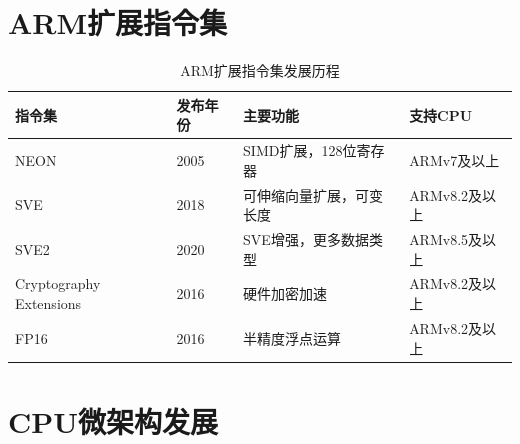 \documentclass[12pt,UTF8]{ctexbook}
\begin{document}
\section{ARM扩展指令集}

\begin{table}[H]
    \centering
    \begin{tabular}{|p{2cm}|p{3cm}|p{6cm}|p{3cm}|}
        \hline
        \textbf{指令集} & \textbf{发布年份} & \textbf{主要功能} & \textbf{支持CPU} \\
        \hline
        NEON & 2005 & SIMD扩展，128位寄存器 & ARMv7及以上 \\
        \hline
        SVE & 2018 & 可伸缩向量扩展，可变长度 & ARMv8.2及以上 \\
        \hline
        SVE2 & 2020 & SVE增强，更多数据类型 & ARMv8.5及以上 \\
        \hline
        Cryptography Extensions & 2016 & 硬件加密加速 & ARMv8.2及以上 \\
        \hline
        FP16 & 2016 & 半精度浮点运算 & ARMv8.2及以上 \\
        \hline
    \end{tabular}
    \caption{ARM扩展指令集发展历程}
    \label{tab:arm_extensions}
\end{table}

\section{CPU微架构发展}
\end{document}
